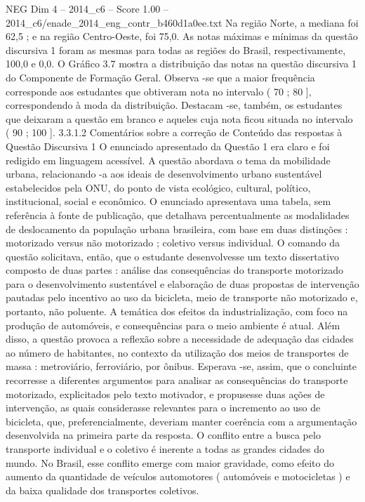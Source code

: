 \begin{textsample}{NEG Dim 4 – 2014\_c6 – Score 1.00 – 2014\_c6/enade\_2014\_eng\_contr\_b460d1a0ee.txt}
Na região Norte, a mediana foi 62,5 ; e na região Centro-Oeste, foi 75,0.
As notas máximas e mínimas da questão discursiva 1 foram as mesmas para todas as regiões do Brasil, respectivamente, 100,0 e 0,0.
O Gráfico 3.7 mostra a distribuição das notas na questão discursiva 1 do Componente de Formação Geral.
Observa -se que a maior frequência corresponde aos estudantes que obtiveram nota no intervalo ( 70 ; 80 ], correspondendo à moda da distribuição.
Destacam -se, também, os estudantes que deixaram a questão em branco e aqueles cuja nota ficou situada no intervalo ( 90 ; 100 ]. 3.3.1.2 Comentários sobre a correção de Conteúdo das respostas à Questão Discursiva 1 O enunciado apresentado da Questão 1 era claro e foi redigido em linguagem acessível.
A questão abordava o tema da mobilidade urbana, relacionando -a aos ideais de desenvolvimento urbano sustentável estabelecidos pela ONU, do ponto de vista ecológico, cultural, político, institucional, social e econômico.
O enunciado apresentava uma tabela, sem referência à fonte de publicação, que detalhava percentualmente as modalidades de deslocamento da população urbana brasileira, com base em duas distinções : motorizado versus não motorizado ; coletivo versus individual.
O comando da questão solicitava, então, que o estudante desenvolvesse um texto dissertativo composto de duas partes : análise das consequências do transporte motorizado para o desenvolvimento sustentável e elaboração de duas propostas de intervenção pautadas pelo incentivo ao uso da bicicleta, meio de transporte não motorizado e, portanto, não poluente.
A temática dos efeitos da industrialização, com foco na produção de automóveis, e consequências para o meio ambiente é atual.
Além disso, a questão provoca a reflexão sobre a necessidade de adequação das cidades ao número de habitantes, no contexto da utilização dos meios de transportes de massa : metroviário, ferroviário, por ônibus.
Esperava -se, assim, que o concluinte recorresse a diferentes argumentos para analisar as consequências do transporte motorizado, explicitados pelo texto motivador, e propusesse duas ações de intervenção, as quais considerasse relevantes para o incremento ao uso de bicicleta, que, preferencialmente, deveriam manter coerência com a argumentação desenvolvida na primeira parte da resposta.
O conflito entre a busca pelo transporte individual e o coletivo é inerente a todas as grandes cidades do mundo.
No Brasil, esse conflito emerge com maior gravidade, como efeito do aumento da quantidade de veículos automotores ( automóveis e motocicletas ) e da baixa qualidade dos transportes coletivos.

\end{textsample}
